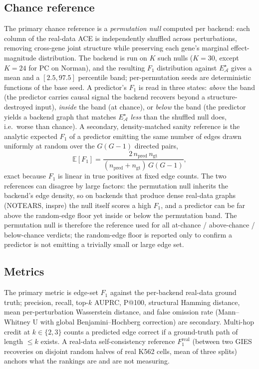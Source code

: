 \documentclass{article}
\theoremstyle{plain}
\theoremstyle{definition}
\theoremstyle{remark}
\begin{document}
\subsection{Chance reference}
\label{sec:chance}
The primary chance reference is a \emph{permutation null} computed per backend: each column of the real-data ACE is independently shuffled across perturbations, removing cross-gene joint structure while preserving each gene's marginal effect-magnitude distribution. The backend is run on $K$ such nulls ($K=30$, except $K=24$ for PC on Norman), and the resulting $F_1$ distribution against $E^{\star}_{\mathcal{A}}$ gives a mean and a $[2.5,97.5]$ percentile band; per-permutation seeds are deterministic functions of the base seed. A predictor's $F_1$ is read in three states: \emph{above} the band (the predictor carries causal signal the backend recovers beyond a structure-destroyed input), \emph{inside} the band (at chance), or \emph{below} the band (the predictor yields a backend graph that matches $E^{\star}_{\mathcal{A}}$ \emph{less} than the shuffled null does, i.e.\ worse than chance). A secondary, density-matched sanity reference is the analytic expected $F_1$ of a predictor emitting the same number of edges drawn uniformly at random over the $G(G{-}1)$ directed pairs,
\[
\mathbb{E}[F_1]=\frac{2\,n_{\text{pred}}\,n_{\text{gt}}}{(n_{\text{pred}}+n_{\text{gt}})\,G(G{-}1)},
\]
exact because $F_1$ is linear in true positives at fixed edge counts. The two references can disagree by large factors: the permutation null inherits the backend's edge density, so on backends that produce dense real-data graphs (NOTEARS, inspre) the null itself scores a high $F_1$, and a predictor can be far above the random-edge floor yet inside or below the permutation band. The permutation null is therefore the reference used for all at-chance / above-chance / below-chance verdicts; the random-edge floor is reported only to confirm a predictor is not emitting a trivially small or large edge set.

\subsection{Metrics}
The primary metric is edge-set $F_1$ against the per-backend real-data ground truth; precision, recall, top-$k$ AUPRC, P@100, structural Hamming distance, mean per-perturbation Wasserstein distance, and false omission rate (Mann--Whitney U with global Benjamini--Hochberg correction) are secondary. Multi-hop credit at $k\in\{2,3\}$ counts a predicted edge correct if a ground-truth path of length $\leq k$ exists. A real-data self-consistency reference $F_1^{\text{real}}$ (between two GIES recoveries on disjoint random halves of real K562 cells, mean of three splits) anchors what the rankings are and are not measuring.
\end{document}
